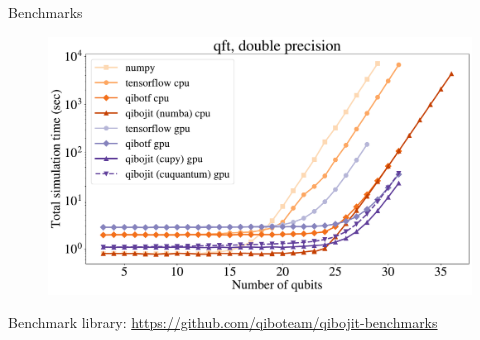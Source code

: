 \documentclass[11pt]{beamer}
\begin{document}
\begin{frame}{Benchmarks}
    \begin{figure}
        \includegraphics[width=0.8 \textwidth]{figures/qibo_scaling_qft_total_simulation_time_double.pdf} 
    \end{figure}
    Benchmark library: \url{https://github.com/qiboteam/qibojit-benchmarks}
\end{frame}
\end{document}

